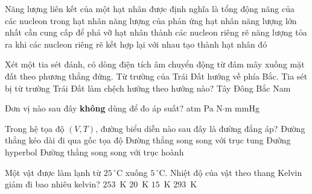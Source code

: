 	\begin{ex}%
		Năng lượng liên kết của một hạt nhân được định nghĩa là
		\choice
		{tổng động năng của các nucleon trong hạt nhân}
		{năng lượng của phản ứng hạt nhân}
		{năng lượng lớn nhất cần cung cấp để phá vỡ hạt nhân thành các nucleon riêng rẽ}
		{\True năng lượng tỏa ra khi các nucleon riêng rẽ kết hợp lại với nhau tạo thành hạt nhân đó}
	\end{ex}

	\begin{ex}%
		Xét một tia sét đánh, có dòng điện tích âm chuyển động từ đám mây xuống mặt đất theo phương thẳng đứng. Từ trường của Trái Đất hướng về phía Bắc. Tia sét bị từ trường Trái Đất làm chệch hướng theo hướng nào?
		\choice
		{\True Tây}
		{Đông}
		{Bắc}
		{Nam}
	\end{ex}

	\begin{ex}%
		Đơn vị nào sau đây \textbf{không} dùng để đo áp suất?
		\choice
		{atm}
		{Pa}
		{\True N$\cdot$m}
		{mmHg}
	\end{ex}

	\begin{ex}%
		Trong hệ tọa độ $(V,T)$, đường biểu diễn nào sau đây là đường đẳng áp?
		\choice
		{\True Đường thẳng kéo dài đi qua gốc tọa độ}
		{Đường thẳng song song với trục tung}
		{Đường hyperbol}
		{Đường thẳng song song với trục hoành}
	\end{ex}

	\begin{ex}%
		Một vật được làm lạnh từ $25\,^\circ\text{C}$ xuống $5\,^\circ\text{C}$. Nhiệt độ của vật theo thang Kelvin giảm đi bao nhiêu kelvin?
		\choice
		{$253$~K}
		{\True $20$~K}
		{$15$~K}
		{$293$~K}
	\end{ex}

